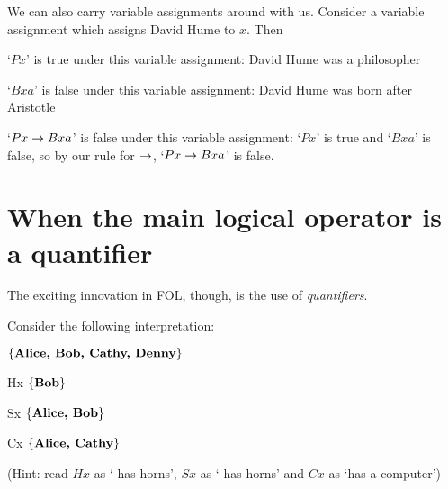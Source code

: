 We can also carry variable assignments around with us. Consider a variable assignment which assigns David Hume to $x$. Then \begin{ebullet}
\item `$Px$' is true under this variable assignment: David Hume was a philosopher
\item `$Bxa$' is false under this variable assignment: David Hume was born after Aristotle
\item `$Px\eif Bxa$' is false under this variable assignment: `$Px$' is true and `$Bxa$' is false, so by our rule for $\eif$, `$Px\eif Bxa$' is false.
\end{ebullet}


\section{When the main logical operator is a quantifier}
The exciting innovation in FOL, though, is the use of \emph{quantifiers}.

Consider the following interpretation:
\begin{center}

\begin{ekey}\item[\text{domain}] $\{\text{\emph{Alice, Bob, Cathy, Denny}}\}$
\item[Hx] $\{\text{\emph{Bob}}\}$
\item[Sx] $\{\text{\emph{Alice, Bob}}\}$
\item[Cx]$\{\text{\emph{Alice, Cathy}}\}$
\end{ekey}
\end{center}
(Hint: read $Hx$ as ` has horns', $Sx$ as ` has horns' and $Cx$ as `has a computer')\\

